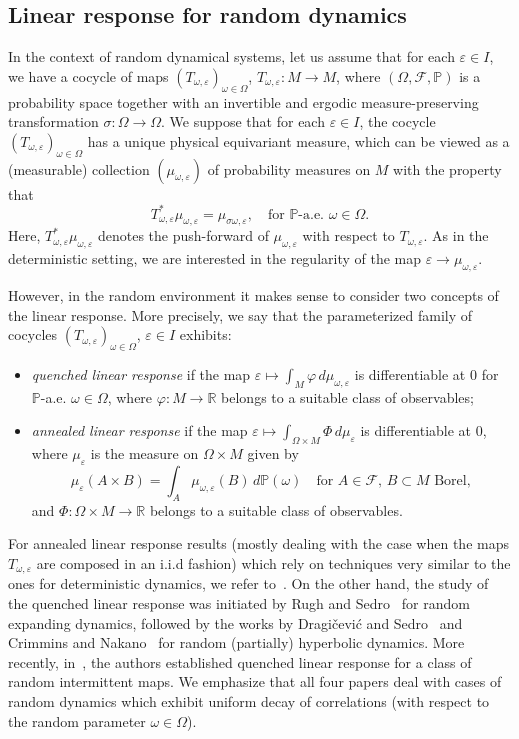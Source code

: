 \documentclass[11pt,reqno,a4paper]{article}
\theoremstyle{special}
\def\R{\mathbb{R}}
\def\om{\omega}
\begin{document}
\subsection{Linear response for random dynamics}
In the context of random dynamical systems, let us assume that for each $\varepsilon \in I$, we have a cocycle of maps $(T_{\omega, \varepsilon})_{\omega \in \Omega}$, $T_{\omega, \varepsilon}\colon M\to M$,
 where $(\Omega, \mathcal F, \mathbb P)$ is a probability space together with an invertible and ergodic measure-preserving transformation $\sigma \colon \Omega \to \Omega$.
We suppose that for each $\varepsilon \in I$, the cocycle $(T_{\omega, \varepsilon})_{\omega \in \Omega}$ has a unique physical equivariant measure, which can be viewed as a (measurable) collection $(\mu_{\om, \varepsilon})$ of probability measures on $M$ with the property that 
\[
T_{\om,\varepsilon}^* \mu_{\om, \varepsilon}=\mu_{\sigma \om, \varepsilon}, \quad \text{for $\mathbb P$-a.e. $\om \in \Omega$.}
\]
Here, $T_{\om,\varepsilon}^* \mu_{\om, \varepsilon}$ denotes the push-forward of $\mu_{\om, \varepsilon}$ with respect to $T_{\om, \varepsilon}$. As in the deterministic setting, we are interested in the regularity of the map $\varepsilon \to \mu_{\om, \varepsilon}$.

However, in the random environment it makes sense to consider two concepts of the linear response. More precisely, we say that the parameterized family of cocycles $(T_{\omega, \varepsilon})_{\omega \in \Omega}$, $\varepsilon \in I$ exhibits:
\begin{itemize}
\item \emph{quenched linear response} if the map $\varepsilon \mapsto \int_M\varphi \, d\mu_{\om, \varepsilon}$ is differentiable at $0$ for $\mathbb P$-a.e. $\om \in \Omega$, where $\varphi \colon M\to \R$ belongs to a suitable class of observables;
\item \emph{annealed linear response} if the map $\varepsilon \mapsto \int_{\Omega \times M} \Phi \, d\mu_\varepsilon$ is differentiable at $0$, where $\mu_\varepsilon$ is the measure on $\Omega \times M$ given by 
\[
\mu_\varepsilon (A \times B)=\int_A \mu_{\om, \varepsilon}(B)\, d\mathbb P(\om) \quad \text{for $A\in \mathcal F$, $B\subset M$ Borel},
\]
and $\Phi \colon \Omega \times M \to \R$ belongs to a suitable class of observables.
\end{itemize}
For annealed linear response results (mostly dealing with the case when the maps $T_{\om, \varepsilon}$ are composed in an i.i.d fashion) which rely on techniques very similar to the ones for deterministic dynamics, we refer to~\cite{BRS,GG,GS,GL}. On the other hand,  the study of the quenched linear response was initiated by  Rugh and Sedro~\cite{RS} for random expanding dynamics, followed by the works by Dragi\v cevi\' c and Sedro~\cite{DS} and Crimmins and  Nakano~\cite{CN} for random (partially) hyperbolic dynamics. More recently, in~\cite{DGTS}, the authors established quenched linear response for a class of random intermittent maps.
We emphasize that all four papers deal with cases of random dynamics which exhibit uniform decay of correlations (with respect to the random parameter $\om \in \Omega$). 
\end{document}
